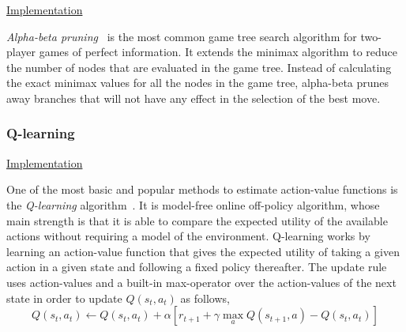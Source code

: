 \documentclass{article}
\newcommand{\GithubURL}[2]{
\noindent
\href{https://github.com/davidrobles/mlnd-capstone-code/blob/master/#1}{#2}
\break
}
\begin{document}
\GithubURL{capstone/game/players/alphabeta.py}{Implementation}


\emph{Alpha-beta pruning}~\citep{Knuth1975AB} is the most common game tree search algorithm for
two-player games of perfect information. It extends the minimax algorithm to reduce the number of
nodes that are evaluated in the game tree. Instead of calculating the exact minimax values for all
the nodes in the game tree, alpha-beta prunes away branches that will not have any effect in the
selection of the best move.




\subsubsection{Q-learning}

\GithubURL{capstone/rl/learners/qlearning.py}{Implementation}

One of the most basic and popular methods to estimate action-value functions is the
\emph{Q-learning} algorithm~\citep{Watkins1989PhD}. It is model-free online off-policy algorithm,
whose main strength is that it is able to compare the expected utility of the available actions
without requiring a model of the environment. Q-learning works by learning an action-value function
that gives the expected utility of taking a given action in a given state and following a fixed
policy thereafter. The update rule uses action-values and a built-in max-operator over the
action-values of the next state in order to update $Q(s_t, a_t)$ as follows,
%
\begin{equation}
    Q(s_t, a_t) \gets Q(s_t, a_t) + \alpha [r_{t+1} + \gamma \max_a Q(s_{t+1}, a) - Q(s_t, a_t)]
\end{equation}
\end{document}
